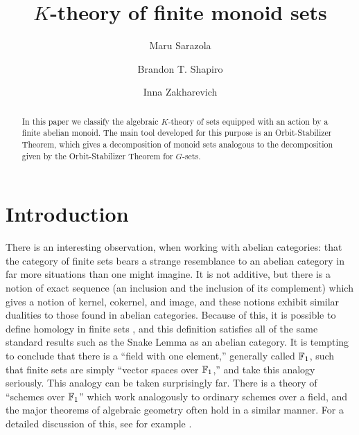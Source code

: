 \documentclass[11pt]{amsart}
\begin{document}
\title{$K$-theory of finite monoid sets}
\author[Sarazola]{Maru Sarazola}
\address{School of Mathematics, University of Minnesota, Minneapolis MN, 55455}
\author[Shapiro]{Brandon T. Shapiro}
\address{Department of Mathematics, Florida Gulf Coast University, Fort Meyers, FL, 33965}
\author[Zakharevich]{Inna Zakharevich}
\address{Department of Mathematics, Cornell University, Ithaca, NY 14850}



\begin{abstract}
In this paper we classify the algebraic $K$-theory of sets equipped with an action by a finite abelian monoid.  The main tool developed for this purpose is an Orbit-Stabilizer Theorem, which gives a decomposition of monoid sets analogous to the decomposition given by the Orbit-Stabilizer Theorem for $G$-sets.
\end{abstract}

\maketitle

\section*{Introduction}

There is an interesting observation, when working with abelian categories: that the category of finite sets bears a strange resemblance to an abelian category in far more situations than one might imagine.  It is not additive, but there is a notion of exact sequence (an inclusion and the inclusion of its complement) which gives a notion of kernel, cokernel, and image, and these notions exhibit similar dualities to those found in abelian categories.  Because of this, it is possible to define homology in finite sets \cite{ACGWhomology}, and this definition satisfies all of the same standard results such as the Snake Lemma as an abelian category.  It is tempting to conclude that there is a ``field with one element,'' generally called $\mathbb{F}_1$, such that finite sets are simply ``vector spaces over $\mathbb{F}_1$,'' and take this analogy seriously. This analogy can be taken surprisingly far.  There is a theory of ``schemes over $\mathbb{F}_1$'' which work analogously to ordinary schemes over a field, and the major theorems of algebraic geometry often hold in a similar manner.  For a detailed discussion of this, see for example \cite{deitmar05,F1schemes}.
\end{document}
